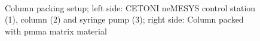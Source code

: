 \begin{figure}[h]
          \begin{subfigure}{0.49\textwidth}
                  \flushleft
          \end{subfigure}\hfill
        \begin{subfigure}{0.49\textwidth}
                \flushright
        \end{subfigure}
        \\
        
        \caption[Column packing setup]{Column packing setup; left side: CETONI neMESYS control station (1), column (2) and syringe pump (3); right side: Column packed with \gls{pmma} matrix material }
        \label{fig:Packing_Setup_Column}
  \end{figure}

